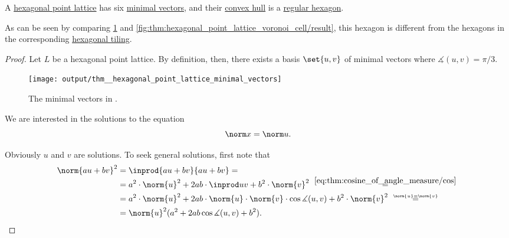 \begin{proposition}\label{thm:hexagonal_point_lattice_minimal_vectors}
  A \hyperref[def:hexagonal_point_lattice]{hexagonal point lattice} has six \hyperref[def:minimal_lattice_vector]{minimal vectors}, and their \hyperref[def:convex_hull]{convex hull} is a \hyperref[def:regular_polygon]{regular hexagon}.
\end{proposition}
\begin{comments}
  \item As can be seen by comparing \cref{fig:thm:hexagonal_point_lattice_minimal_vectors} and \cref{fig:thm:hexagonal_point_lattice_voronoi_cell/result}, this hexagon is different from the hexagons in the corresponding \hyperref[def:hexagonal_tiling]{hexagonal tiling}.
\end{comments}
\begin{proof}
  Let \( L \) be a hexagonal point lattice. By definition, then, there exists a basis \( \set{ u, v } \) of minimal vectors where \( \measuredangle(u, v) = \pi / 3 \).

  \begin{figure}[!ht]
    \centering
    \texttt{[image: output/thm\_\_hexagonal\_point\_lattice\_minimal\_vectors]}
    \caption{The minimal vectors in .}\label{fig:thm:hexagonal_point_lattice_minimal_vectors}
  \end{figure}

   We are interested in the solutions to the equation
  \begin{equation}\label{eq:thm:hexagonal_point_lattice_minimal_vectors/proof/eq_norm}
    \norm x = \norm u.
  \end{equation}

  Obviously \( u \) and \( v \) are solutions. To seek general solutions, first note that
  \begin{align*}
    \norm{au + bv}^2
    &=
    \inprod {au + bv} {au + bv}
    = \\ &=
    a^2 \cdot \norm{u}^2 + 2ab \cdot \inprod u v + b^2 \cdot \norm{v}^2
    \reloset{\eqref{eq:thm:cosine_of_angle_measure/cos}} = \\ &=
    a^2 \cdot \norm{u}^2 + 2ab \cdot \norm{u} \cdot \norm{v} \cdot \cos\measuredangle(u, v) + b^2 \cdot \norm{v}^2
    \reloset{\norm{u} = \norm{v}} = \\ &=
    \norm{u}^2 (a^2 + 2ab \cos\measuredangle(u, v) + b^2).
  \end{align*}


\end{proof}
